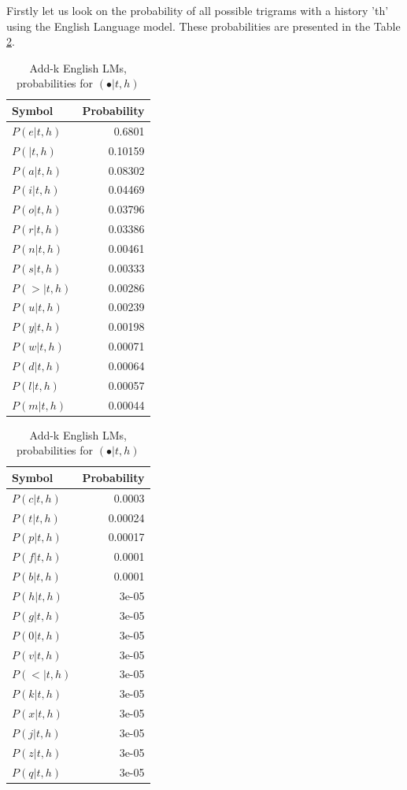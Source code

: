 Firstly let us look on the probability of all possible trigrams with a history 'th' using the English Language model. These probabilities are presented in the Table \ref{tab:add-alpha-smoothing}.
\begin{table}[h]
	\centering
	\begin{minipage}{0.48\linewidth}
	\begin{tabular}{lr}
	\toprule
	Symbol & Probability \\
	\midrule
	$P(e|t,h)$ & 0.6801 \\
	$P( |t,h)$ & 0.10159 \\
	$P(a|t,h)$ & 0.08302 \\
	$P(i|t,h)$ & 0.04469 \\
	$P(o|t,h)$ & 0.03796 \\
	$P(r|t,h)$ & 0.03386 \\
	$P(n|t,h)$ & 0.00461 \\
	$P(s|t,h)$ & 0.00333 \\
	$P(>|t,h)$ & 0.00286 \\
	$P(u|t,h)$ & 0.00239 \\
	$P(y|t,h)$ & 0.00198 \\
	$P(w|t,h)$ & 0.00071 \\
	$P(d|t,h)$ & 0.00064 \\
	$P(l|t,h)$ & 0.00057 \\
	$P(m|t,h)$ & 0.00044 \\
	\bottomrule
	\end{tabular}
	\end{minipage}\hfill\begin{minipage}{0.48\linewidth}
	\begin{tabular}{lr}
	\toprule
	Symbol & Probability \\
	\midrule
	$P(c|t,h)$ & 0.0003 \\
	$P(t|t,h)$ & 0.00024 \\
	$P(p|t,h)$ & 0.00017 \\
	$P(f|t,h)$ & 0.0001 \\
	$P(b|t,h)$ & 0.0001 \\
	$P(h|t,h)$ & 3e-05 \\
	$P(g|t,h)$ & 3e-05 \\
	$P(0|t,h)$ & 3e-05 \\
	$P(v|t,h)$ & 3e-05 \\
	$P(<|t,h)$ & 3e-05 \\
	$P(k|t,h)$ & 3e-05 \\
	$P(x|t,h)$ & 3e-05 \\
	$P(j|t,h)$ & 3e-05 \\
	$P(z|t,h)$ & 3e-05 \\
	$P(q|t,h)$ & 3e-05 \\
	\bottomrule
	\end{tabular}
	\end{minipage}

	\vspace*{0.1cm}
	\caption{Add-k English LMs, probabilities for $(\bullet|t, h)$ }
	\label{tab:add-alpha-smoothing}
\end{table}
